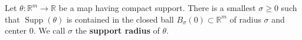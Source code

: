 Let $\theta: \mathbb{R}^m \to \mathbb{R}$ be a map having compact support. There is a smallest $\sigma \geqslant 0$ such that $\operatorname{Supp}(\theta)$ is contained in the closed ball $B_\sigma(0) \subset \mathbb{R}^m$ of radius $\sigma$ and center $0$. We call $\sigma$ the \textbf{support radius} of $\theta$.
